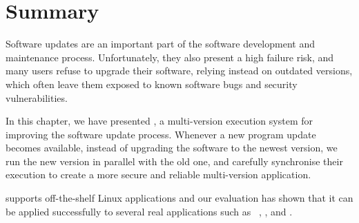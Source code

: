 \section{Summary}
\label{safe-updates:summary}

Software updates are an important part of the software development and
maintenance process. Unfortunately, they also present a high failure risk, and
many users refuse to upgrade their software, relying instead on outdated
versions, which often leave them exposed to known software bugs and security
vulnerabilities.

In this chapter, we have presented \mx, a multi-version execution system for
improving the software update process. Whenever a new program update becomes
available, instead of upgrading the software to the newest version, we run the
new version in parallel with the old one, and carefully synchronise their
execution to create a more secure and reliable multi-version application.

\mx supports off-the-shelf Linux applications and our evaluation has shown that
it can be applied successfully to several real applications such as
\gnu~\coreutils, \lighttpd, and \redis.
